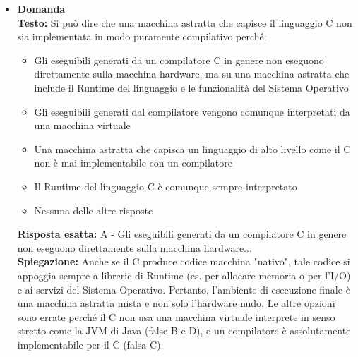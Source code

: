 \documentclass[12pt, a4paper]{article}
\newcounter{domandateoria}
\begin{document}
\begin{itemize}
    \item {}\textbf{Domanda \thedomandateoria} \\
    \textbf{Testo:} Si può dire che una macchina astratta che capisce il linguaggio C non sia implementata in modo puramente compilativo perché:
    \begin{itemize}
        \item[A)] Gli eseguibili generati da un compilatore C in genere non eseguono direttamente sulla macchina hardware, ma su una macchina astratta che include il Runtime del linguaggio e le funzionalità del Sistema Operativo
        \item[B)] Gli eseguibili generati dal compilatore vengono comunque interpretati da una macchina virtuale
        \item[C)] Una macchina astratta che capisca un linguaggio di alto livello come il C non è mai implementabile con un compilatore
        \item[D)] Il Runtime del linguaggio C è comunque sempre interpretato
        \item[E)] Nessuna delle altre risposte
    \end{itemize}
    \textbf{Risposta esatta:} A - Gli eseguibili generati da un compilatore C in genere non eseguono direttamente sulla macchina hardware... \\
    \textbf{Spiegazione:} Anche se il C produce codice macchina "nativo", tale codice si appoggia sempre a librerie di Runtime (es. per allocare memoria o per l'I/O) e ai servizi del Sistema Operativo. Pertanto, l'ambiente di esecuzione finale è una macchina astratta mista e non solo l'hardware nudo. Le altre opzioni sono errate perché il C non usa una macchina virtuale interprete in senso stretto come la JVM di Java (false B e D), e un compilatore è assolutamente implementabile per il C (falsa C).
    \vspace{0.3cm}

\newpage


\end{itemize}
\end{document}

